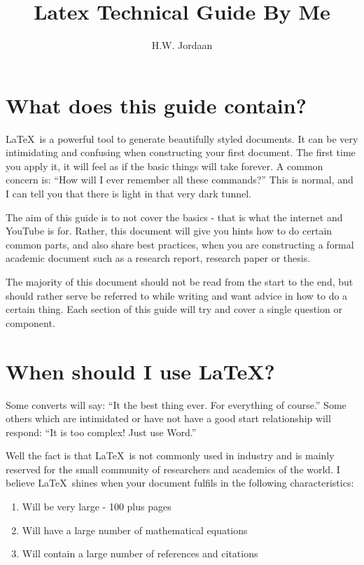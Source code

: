 \documentclass[12pt]{article}
\title{Latex Technical Guide By Me}
\author{H.W. Jordaan}
\begin{document}
\maketitle

\section*{What does this guide contain?}
\LaTeX~is a powerful tool to generate beautifully styled documents.
It can be very intimidating and confusing when constructing your first document.
The first time you apply it, it will feel as if the basic things will take forever.
A common concern is: ``How will I ever remember all these commands?''
This is normal, and I can tell you that there is light in that very dark tunnel.

The aim of this guide is to not cover the basics - that is what the internet and YouTube is for.
Rather, this document will give you hints how to do certain common parts, and also share best practices, when you are constructing a formal academic document such as a research report, research paper or thesis.

The majority of this document should not be read from the start to the end, but should rather serve be referred to while writing and want advice in how to do a certain thing.
Each section of this guide will try and cover a single question or component.

\section*{When should I use \LaTeX?}
Some converts will say: ``It the best thing ever.  For everything of course.''
Some others which are intimidated or have not have a good start relationship will respond: ``It is too complex!  Just use Word.''

Well the fact is that \LaTeX~is not commonly used in industry and is mainly reserved for the small community of researchers and academics of the world.
I believe \LaTeX~shines when your document fulfils in the following characteristics:
\begin{enumerate}
	\item Will be very large - 100 plus pages
	\item Will have a large number of mathematical equations
	\item Will contain a large number of references and citations
\end{enumerate}
\end{document}
